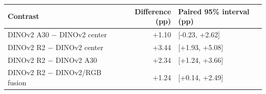 \begin{tabular}{lrl}
\toprule Contrast & Difference (pp) & Paired 95\% interval (pp) \\
\midrule
DINOv2 A30 $-$ DINOv2 center & +1.10 & [-0.23, +2.62] \\
DINOv2 R2 $-$ DINOv2 center & +3.44 & [+1.93, +5.08] \\
DINOv2 R2 $-$ DINOv2 A30 & +2.34 & [+1.24, +3.66] \\
DINOv2 R2 $-$ DINOv2/RGB fusion & +1.24 & [+0.14, +2.49] \\
\bottomrule\end{tabular}
